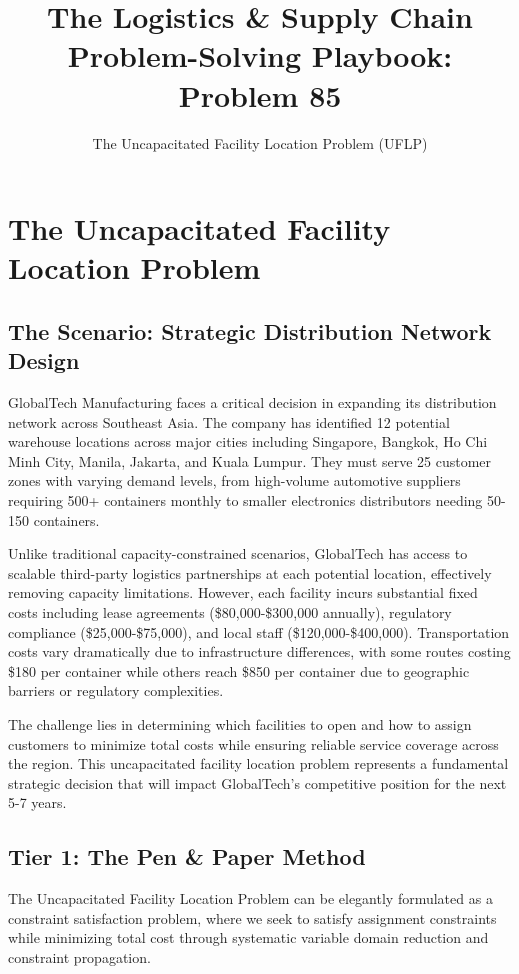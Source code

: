 \documentclass{article}
\title{The Logistics \& Supply Chain Problem-Solving Playbook:\\Problem 85}
\author{The Uncapacitated Facility Location Problem (UFLP)}
\date{}
\begin{document}
\maketitle

\section{The Uncapacitated Facility Location Problem}

\subsection{The Scenario: Strategic Distribution Network Design}

GlobalTech Manufacturing faces a critical decision in expanding its distribution network across Southeast Asia. The company has identified 12 potential warehouse locations across major cities including Singapore, Bangkok, Ho Chi Minh City, Manila, Jakarta, and Kuala Lumpur. They must serve 25 customer zones with varying demand levels, from high-volume automotive suppliers requiring 500+ containers monthly to smaller electronics distributors needing 50-150 containers.

Unlike traditional capacity-constrained scenarios, GlobalTech has access to scalable third-party logistics partnerships at each potential location, effectively removing capacity limitations. However, each facility incurs substantial fixed costs including lease agreements (\$80,000-\$300,000 annually), regulatory compliance (\$25,000-\$75,000), and local staff (\$120,000-\$400,000). Transportation costs vary dramatically due to infrastructure differences, with some routes costing \$180 per container while others reach \$850 per container due to geographic barriers or regulatory complexities.

The challenge lies in determining which facilities to open and how to assign customers to minimize total costs while ensuring reliable service coverage across the region. This uncapacitated facility location problem represents a fundamental strategic decision that will impact GlobalTech's competitive position for the next 5-7 years.

\subsection{Tier 1: The Pen \& Paper Method}

The Uncapacitated Facility Location Problem can be elegantly formulated as a constraint satisfaction problem, where we seek to satisfy assignment constraints while minimizing total cost through systematic variable domain reduction and constraint propagation.
\end{document}
